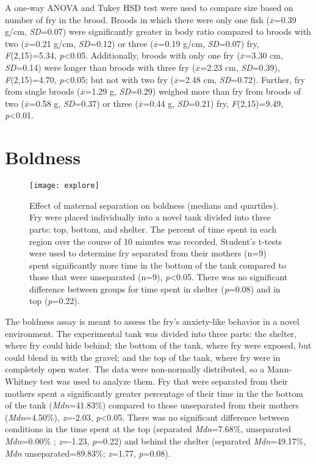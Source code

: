 \documentclass[12pt,twoside]{reedthesis}
\begin{document}
A one-way ANOVA and Tukey HSD test were used to compare size based on number of fry in the brood.
Broods in which there were only one fish ($\overline{x}$=0.39 g/cm, \textit{SD}=0.07) were significantly greater in
body ratio compared to broods with two ($\overline{x}$=0.21 g/cm, \textit{SD}=0.12) or three
($\overline{x}$=0.19 g/cm, \textit{SD}=0.07)
fry, \textit{F}(2,15)=5.34, \textit{p}<0.05. Additionally, broods with
only one fry ($\overline{x}$=3.30 cm, \textit{SD}=0.14) were longer than broods
with three fry ($\overline{x}$=2.23 cm, \textit{SD}=0.39),
\textit{F}(2,15)=4.70, \textit{p}<0.05; but not with two fry
($\overline{x}$=2.48 cm, \textit{SD}=0.72). Further, fry from single broods
($\overline{x}$=1.29 g, \textit{SD}=0.29) weighed more than fry from broods of two
($\overline{x}$=0.58 g, \textit{SD}=0.37) or three ($\overline{x}$=0.44 g, \textit{SD}=0.21) fry,
\textit{F}(2,15)=9.49,
\textit{p}<0.01. 

\section{Boldness}

\begin{figure}[htbp] 
\begin{center} 
\texttt{[image: explore]}
\caption[Effect of maternal separation on boldness]{\footnotesize{Effect of
    maternal separation on boldness (medians and quartiles).\\ Fry were placed individually into a novel tank
    divided into three parts: top, bottom, and shelter. The percent of time
    spent in each region over the course of 10 minutes was recorded. Student's t-tests were used to determine fry
    separated from their mothers (n=9) spent significantly more time in the bottom of
    the tank compared to those that were unseparated (n=9), \textit{p}<0.05. There was
    no significant difference between groups for time spent in shelter
    (\textit{p}=0.08) and in top (\textit{p}=0.22).}}
\label{subd}
\end{center} 
\end{figure}

The boldness assay is meant to assess the fry's anxiety-like behavior in a novel
environment. The experimental tank was divided into three parts: the shelter,
where fry could hide behind; the bottom of the tank, where fry were exposed, but
could blend in with the gravel; and the top of the tank, where fry were in
completely open water. The data were non-normally distributed, so a Mann-Whitney test was used to analyze them. Fry that were separated from their mothers spent a
significantly greater percentage of their time in the the bottom of the tank
(\textit{Mdn}=41.83\%) compared to those unseparated from their mothers (\textit{Mdn}=4.50\%), \textit{z}=-2.03, \textit{p}<0.05. There was no significant difference between conditions in the
time spent at the top (separated \textit{Mdn}=7.68\%, unseparated \textit{Mdn}=0.00\%
; \textit{z}=-1.23, \textit{p}=0.22) and behind the shelter (separated \textit{Mdn}=49.17\%,
\textit{Mdn} unseparated=89.83\%; \textit{z}=1.77, \textit{p}=0.08). 
\end{document}
